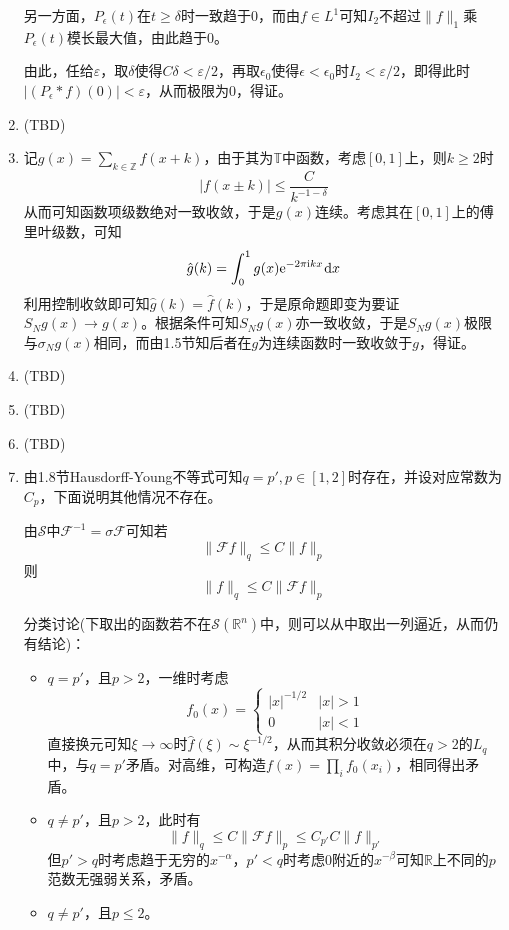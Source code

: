 \documentclass[a4paper,UTF8,fontset=windows]{ctexart}
\newcommand*{\er}{\mathrm{e}}
\newcommand*{\ir}{\mathrm{i}}
\newcommand*{\dr}{\hspace{0.07em}\mathrm{d}}
\begin{document}
\begin{enumerate}
    另一方面，$P_\epsilon(t)$在$t\ge\delta$时一致趋于0，而由$f\in L^1$可知$I_2$不超过$\|f\|_1$乘$P_\epsilon(t)$模长最大值，由此趋于0。

    由此，任给$\varepsilon$，取$\delta$使得$C\delta<\varepsilon/2$，再取$\epsilon_0$使得$\epsilon<\epsilon_0$时$I_2<\varepsilon/2$，即得此时$|(P_\epsilon*f)(0)|<\varepsilon$，从而极限为0，得证。

    \item (TBD)
    
    \item 记$g(x)=\sum_{k\in\mathbb{Z}}f(x+k)$，由于其为$\mathbb{T}$中函数，考虑$[0,1]$上，则$k\ge 2$时
    $$|f(x\pm k)|\le\frac{C}{k^{-1-\delta}}$$
    从而可知函数项级数绝对一致收敛，于是$g(x)$连续。考虑其在$[0,1]$上的傅里叶级数，可知
    $$\hat{g}(k)=\int_0^1g(x)\er^{-2\pi\ir kx}\dr x$$
    利用控制收敛即可知$\hat{g}(k)=\hat{f}(k)$，于是原命题即变为要证$S_Ng(x)\to g(x)$。根据条件可知$S_Ng(x)$亦一致收敛，于是$S_Ng(x)$极限与$\sigma_Ng(x)$相同，而由1.5节知后者在$g$为连续函数时一致收敛于$g$，得证。

    \item (TBD)

    \item (TBD)
    
    \item (TBD)

    \item 由1.8节Hausdorff-Young不等式可知$q=p',p\in[1,2]$时存在，并设对应常数为$C_p$，下面说明其他情况不存在。
    
    由$\mathcal{S}$中$\mathcal{F}^{-1}=\sigma\mathcal{F}$可知若
    $$\|\mathcal{F}f\|_q\le C\|f\|_p$$
    则
    $$\|f\|_q\le C\|\mathcal{F}f\|_p$$

    分类讨论(下取出的函数若不在$\mathcal{S}(\mathbb{R}^n)$中，则可以从中取出一列逼近，从而仍有结论)：
    \begin{itemize}
        \item $q=p'$，且$p>2$，一维时考虑
        $$f_0(x)=\begin{cases}|x|^{-1/2}&|x|>1\\0&|x|<1\end{cases}$$
        直接换元可知$\xi\to\infty$时$\hat{f}(\xi)\sim\xi^{-1/2}$，从而其积分收敛必须在$q>2$的$L_q$中，与$q=p'$矛盾。对高维，可构造$f(x)=\prod_if_0(x_i)$，相同得出矛盾。
        \item $q\ne p'$，且$p>2$，此时有
        $$\|f\|_q\le C\|\mathcal{F}f\|_p\le C_{p'}C\|f\|_{p'}$$
        但$p'>q$时考虑趋于无穷的$x^{-\alpha}$，$p'<q$时考虑0附近的$x^{-\beta}$可知$\mathbb{R}$上不同的$p$范数无强弱关系，矛盾。
        \item $q\ne p'$，且$p\le 2$。
        

\end{itemize}
\end{enumerate}
\end{document}
